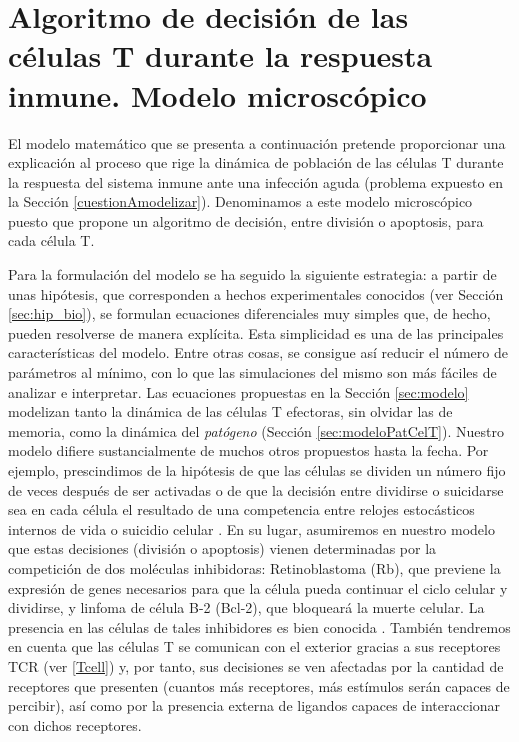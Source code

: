 \chapter{Algoritmo de decisión de las células T durante la respuesta inmune. Modelo microscópico}
\label{cap:descripcionTrabajo}


El modelo matemático que se presenta a continuación pretende proporcionar una explicación al proceso que rige la dinámica de población de las células T durante la respuesta del sistema inmune ante una infección aguda (problema expuesto en la Sección \ref{cuestionAmodelizar}). Denominamos a este modelo microscópico puesto que propone un algoritmo de decisión, entre división o apoptosis, para cada célula T. %

Para la formulación del modelo se ha seguido la siguiente estrategia: a partir de unas hipótesis, que corresponden a hechos experimentales conocidos (ver Sección \ref{sec:hip_bio}), se formulan ecuaciones diferenciales muy simples que, de hecho, pueden resolverse de manera explícita. Esta simplicidad es una de las principales características del modelo. Entre otras cosas, se consigue así reducir el número de parámetros al mínimo, con lo que las simulaciones del mismo son más fáciles de analizar e interpretar. Las ecuaciones propuestas en la Sección \ref{sec:modelo} modelizan tanto la dinámica de las células T efectoras, sin olvidar las de memoria, como la dinámica del \textit{patógeno} (Sección \ref{sec:modeloPatCelT}). Nuestro modelo difiere sustancialmente de muchos otros propuestos hasta la fecha. Por ejemplo, prescindimos de la hipótesis de que las células se dividen un número fijo de veces después de ser activadas \citep{JTB} o de que la decisión entre dividirse o suicidarse sea en cada célula el resultado de una competencia entre relojes estocásticos internos de vida o suicidio celular \citep{JTB}. En su lugar, asumiremos en nuestro modelo que estas decisiones (división o apoptosis) vienen determinadas por la competición de dos moléculas inhibidoras: Retinoblastoma (Rb), que previene la expresión de genes necesarios para que la célula pueda continuar el ciclo celular y dividirse, y linfoma de célula B-2 (Bcl-2), que bloqueará la muerte celular. La presencia en las células de tales inhibidores es bien conocida \citep{fernandez2012mecanica}. También tendremos en cuenta que las células T se comunican con el exterior gracias a sus receptores TCR (ver \ref{Tcell}) y, por tanto, sus decisiones se ven afectadas por la cantidad de receptores que presenten (cuantos más receptores, más estímulos serán capaces de percibir), así como por la presencia externa de ligandos capaces de interaccionar con dichos receptores.


